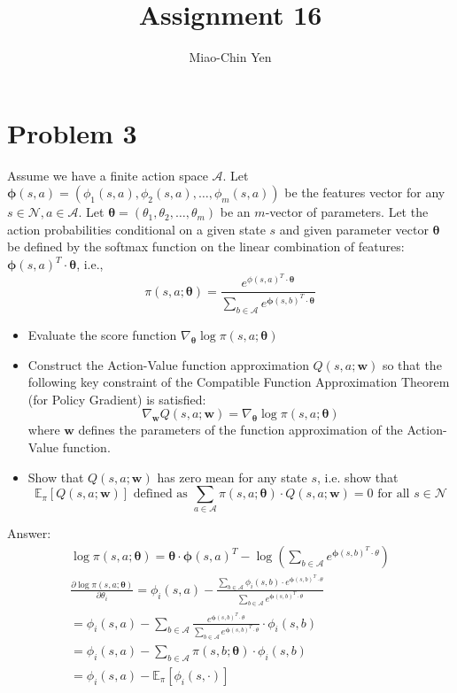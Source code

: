 \documentclass{article}
\title{Assignment 16}
\author{Miao-Chin Yen}
\begin{document}
\maketitle

\section*{Problem 3}
Assume we have a finite action space $\mathcal{A}$. Let $\boldsymbol{\phi}(s, a)=\left(\phi_{1}(s, a), \phi_{2}(s, a), \ldots, \phi_{m}(s, a)\right)$ be the features vector for any $s \in \mathcal{N}, a \in \mathcal{A}$. Let $\boldsymbol{\theta}=\left(\theta_{1}, \theta_{2}, \ldots, \theta_{m}\right)$ be an $m$-vector of parameters. Let the action probabilities conditional on a given state $s$ and given parameter vector $\boldsymbol{\theta}$ be defined by the softmax function on the linear combination of features: $\boldsymbol{\phi}(s, a)^{T} \cdot \boldsymbol{\theta}$, i.e.,
$$
\pi(s, a ; \boldsymbol{\theta})=\frac{e^{\phi(s, a)^{T} \cdot \boldsymbol{\theta}}}{\sum_{b \in \mathcal{A}} e^{\boldsymbol{\phi}(s, b)^{T} \cdot \boldsymbol{\theta}}}
$$
\begin{itemize}
\item Evaluate the score function $\nabla_{\boldsymbol{\theta}} \log \pi(s, a ; \boldsymbol{\theta})$
$$ $$
\item Construct the Action-Value function approximation $Q(s, a ; \boldsymbol{w})$ so that the following key constraint of the Compatible Function Approximation Theorem (for Policy Gradient) is satisfied:
$$
\nabla_{\boldsymbol{w}} Q(s, a ; \boldsymbol{w})=\nabla_{\boldsymbol{\theta}} \log \pi(s, a ; \boldsymbol{\theta})
$$
where $\boldsymbol{w}$ defines the parameters of the function approximation of the Action-Value function.
\item Show that $Q(s, a ; \boldsymbol{w})$ has zero mean for any state $s$, i.e. show that
$$
\mathbb{E}_{\pi}[Q(s, a ; \boldsymbol{w})] \text { defined as } \sum_{a \in \mathcal{A}} \pi(s, a ; \boldsymbol{\theta}) \cdot Q(s, a ; \boldsymbol{w})=0 \text { for all } s \in \mathcal{N}
$$
\end{itemize}
Answer:
$$
\begin{gathered}
\log \pi(s,a ; \boldsymbol{\theta})=\boldsymbol{\theta} \cdot \boldsymbol{\phi}(s, a)^{T}-\log (\sum_{b \in \mathcal{A}} e^{ \boldsymbol{\phi}(s, b)^{T} \cdot {\theta}})\\
\frac{\partial \log \pi(s ,a ; \boldsymbol{\theta})}{\partial \theta_{i}}=\phi_{i}(s, a)-\frac{\sum_{b \in \mathcal{A}} \phi_{i}(s, b) \cdot e^{ \boldsymbol{\phi}(s, b)^{T} \cdot {\theta}}}{\sum_{b \in \mathcal{A}} e^{ \boldsymbol{\phi}(s, b)^{T} \cdot {\theta}} }\\
=\phi_{i}(s, a)-\sum_{b \in \mathcal{A}} \frac{e^{ \boldsymbol{\phi}(s, b)^{T} \cdot {\theta}}}{\sum_{b \in \mathcal{A}} e^{ \boldsymbol{\phi}(s, b)^{T} \cdot {\theta}}  }\cdot \phi_{i}(s, b) \\
=\phi_{i}(s, a)-\sum_{b \in \mathcal{A}} \pi(s, b ; \boldsymbol\theta) \cdot \phi_{i}(s, b) \\
=\phi_{i}(s, a)-\mathbb{E}_{\pi}\left[\phi_{i}(s, \cdot)\right]
\end{gathered}
$$
\end{document}
